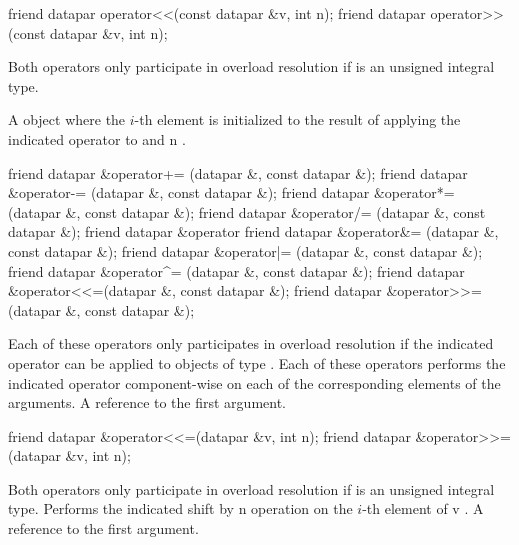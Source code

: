 \begin{itemdecl}
friend datapar operator<<(const datapar &v, int n);
friend datapar operator>>(const datapar &v, int n);
\end{itemdecl}
\begin{itemdescr}
  \pnum\remarks Both operators only participate in overload resolution if  is an unsigned integral type.

  \pnum\returns A \datapar object where the $i$-th element is initialized to the result of applying the indicated operator to  and \code n \foralli.
\end{itemdescr}

\begin{itemdecl}
friend datapar &operator+= (datapar &, const datapar &);
friend datapar &operator-= (datapar &, const datapar &);
friend datapar &operator*= (datapar &, const datapar &);
friend datapar &operator/= (datapar &, const datapar &);
friend datapar &operator%
friend datapar &operator&= (datapar &, const datapar &);
friend datapar &operator|= (datapar &, const datapar &);
friend datapar &operator^= (datapar &, const datapar &);
friend datapar &operator<<=(datapar &, const datapar &);
friend datapar &operator>>=(datapar &, const datapar &);
\end{itemdecl}
\begin{itemdescr}
  \pnum\remarks Each of these operators only participates in overload resolution if the indicated operator can be applied to objects of type .
  \pnum\effects Each of these operators performs the indicated operator component-wise on each of the corresponding elements of the arguments.
  \pnum\returns A reference to the first argument.
\end{itemdescr}

\begin{itemdecl}
friend datapar &operator<<=(datapar &v, int n);
friend datapar &operator>>=(datapar &v, int n);
\end{itemdecl}
\begin{itemdescr}
  \pnum\remarks Both operators only participate in overload resolution if  is an unsigned integral type.
  \pnum\effects Performs the indicated shift by \code n operation on the $i$-th element of \code v \foralli.
  \pnum\returns A reference to the first argument.
\end{itemdescr}

